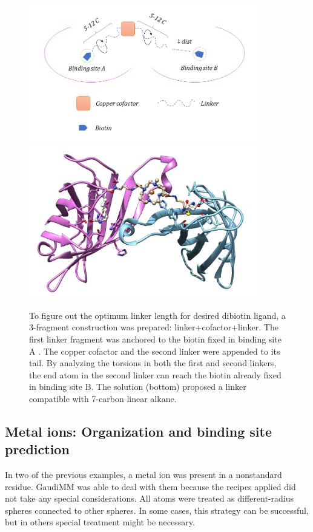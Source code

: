 \begin{figure}
	\begin{Center}
		\includegraphics[width=0.9\textwidth]{./figures/06/dibiotin-scheme.png} \\
		\includegraphics[width=0.9\textwidth]{./figures/06/dibiotin-solution.png}
	\end{Center}
	\caption[Linker length optimization]{To figure out the optimum linker length for  desired dibiotin ligand, a 3-fragment construction was prepared: linker+cofactor+linker. The first linker fragment was anchored to the biotin fixed in binding site A . The copper cofactor and the second linker were appended to its tail. By analyzing the torsions in both the first and second linkers, the end atom in the second linker can reach the biotin already fixed in binding site B. The solution (bottom) proposed a linker compatible with 7-carbon linear alkane.}
	\label{fig:dibiotin-linker-length}
\end{figure}


\subsection{Metal ions: Organization and binding site prediction}
\label{section:metal-applications}
In two of the previous examples, a metal ion was present in a nonstandard residue. GaudiMM was able to deal with them because the recipes applied did not take any special considerations. All atoms were treated as different-radius spheres connected to other spheres. In some cases, this strategy can be successful, but in others special treatment might be necessary.

